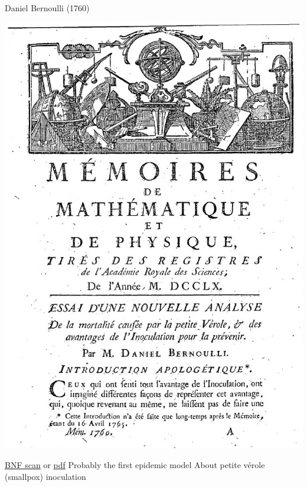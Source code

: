 \documentclass[aspectratio=169]{beamer}\usepackage[]{graphicx}\usepackage[]{xcolor}
\begin{document}
\begin{frame}{Daniel Bernoulli (1760)}
\begin{minipage}{0.5\textwidth}
    \includegraphics[width=\textwidth]{FIGS/Bernoulli-1760-first_page.jpg}
\end{minipage}
\begin{minipage}{0.47\textwidth}
\bbullet \href{https://gallica.bnf.fr/ark:/12148/bpt6k3558n/f220.item}{BNF scan} or \href{https://julien-arino.github.io/assets/pdf/Bernoulli-1760.pdf}{pdf}
\vskip1cm
\bbullet Probably the first epidemic model
\vskip1cm
\bbullet About petite vérole (smallpox) inoculation    
\end{minipage}
\end{frame}
\end{document}

